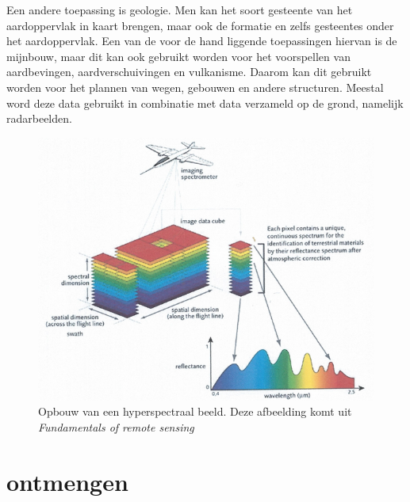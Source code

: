 \documentclass[12pt]{report}
\begin{document}
Een andere toepassing is geologie. Men kan het soort gesteente van het aardoppervlak in kaart brengen, maar ook de formatie en zelfs gesteentes onder het aardoppervlak. Een van de voor de hand liggende toepassingen hiervan is de mijnbouw, maar dit kan ook gebruikt worden voor het voorspellen van aardbevingen, aardverschuivingen en vulkanisme. Daarom kan dit gebruikt worden voor het plannen van wegen, gebouwen en andere structuren. Meestal word deze data gebruikt in combinatie met data verzameld op de grond, namelijk radarbeelden. 

  
\begin{figure}
\includegraphics[width=\textwidth]{hyp.PNG}
\caption{Opbouw van een hyperspectraal beeld. Deze afbeelding komt uit \textit{Fundamentals of remote sensing\cite{fun}}}
\end{figure}

\chapter{ontmengen}



\end{document}
